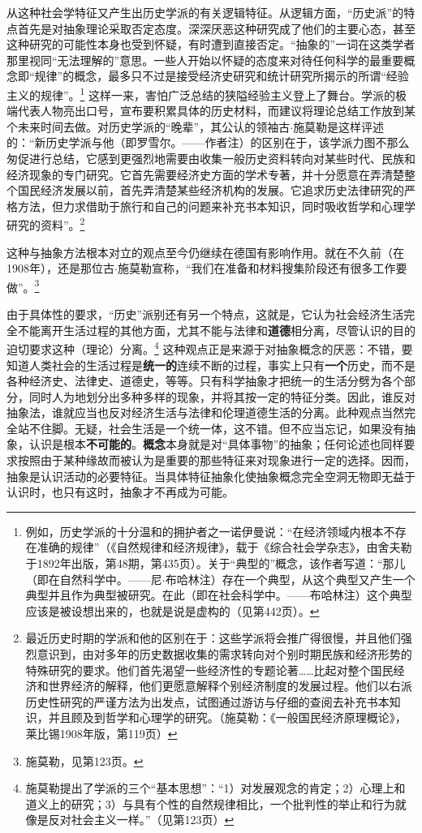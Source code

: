 \documentclass[fontset=fandol, a4paper, 12pt, openright]{ctexbook}
\begin{document}
从这种社会学特征又产生出历史学派的有关逻辑特征。从逻辑方面，“历史派”的特点首先是对抽象理论采取否定态度。深深厌恶这种研究成了他们的主要心态，甚至这种研究的可能性本身也受到怀疑，有时遭到直接否定。“抽象的”一词在这类学者那里视同“无法理解的”意思。一些人开始以怀疑的态度来对待任何科学的最重要概念即“规律”的概念，最多只不过是接受经济史研究和统计研究所揭示的所谓“经验主义的规律”。\footnote{例如，历史学派的十分温和的拥护者之一诺伊曼说：“在经济领域内根本不存在准确的规律”（《自然规律和经济规律》，载于《综合社会学杂志》，由舍夫勒于1892年出版，第48期，第435页）。关于“典型的”概念，该作者写道：“那儿（即在自然科学中。——尼$\cdot$布哈林注）存在一个典型，从这个典型又产生一个典型并且作为典型被研究。在此（即在社会科学中。——布哈林注）这个典型应该是被设想出来的，也就是说是虚构的（见第442页）。} 这样一来，害怕广泛总结的狭隘经验主义登上了舞台。学派的极端代表人物亮出口号，宣布要积累具体的历史材料，而建议将理论总结工作放到某个未来时间去做。对历史学派的“晚辈”，其公认的领袖古$\cdot$施莫勒是这样评述的：“新历史学派与他（即罗雪尔。——作者注）的区别在于，该学派力图不那么匆促进行总结，它感到更强烈地需要由收集一般历史资料转向对某些时代、民族和经济现象的专门研究。它首先需要经济史方面的学术专著，并十分愿意在弄清楚整个国民经济发展以前，首先弄清楚某些经济机构的发展。它追求历史法律研究的严格方法，但力求借助于旅行和自己的问题来补充书本知识，同时吸收哲学和心理学研究的资料”。\footnote{最近历史时期的学派和他的区别在于：这些学派将会推广得很慢，并且他们强烈意识到，由对多年的历史数据收集的需求转向对个别时期民族和经济形势的特殊研究的要求。他们首先渴望一些经济性的专题论著……比起对整个国民经济和世界经济的解释，他们更愿意解释个别经济制度的发展过程。他们以右派历史性研究的严谨方法为出发点，试图通过游访与仔细的查阅去补充书本知识，并且顾及到哲学和心理学的研究。（施莫勒：《一般国民经济原理概论》，莱比锡1908年版，第119页）}

这种与抽象方法根本对立的观点至今仍继续在德国有影响作用。就在不久前（在1908年），还是那位古$\cdot$施莫勒宣称，“我们在准备和材料搜集阶段还有很多工作要做”。\footnote{施莫勒，见第123页。}

由于具体性的要求，“历史”派别还有另一个特点，这就是，它认为社会经济生活完全不能离开生活过程的其他方面，尤其不能与法律和\textbf{道德}相分离，尽管认识的目的迫切要求这种（理论）分离。\footnote{施莫勒提出了学派的三个“基本思想”：“1）对发展观念的肯定；2）心理上和道义上的研究；3）与具有个性的自然规律相比，一个批判性的举止和行为就像是反对社会主义一样。”（见第123页）} 这种观点正是来源于对抽象概念的厌恶：不错，要知道人类社会的生活过程是\textbf{统一的}连续不断的过程，事实上只有\textbf{一个}历史，而不是各种经济史、法律史、道德史，等等。只有科学抽象才把统一的生活分劈为各个部分，同时人为地划分出多种多样的现象，并将其按一定的特征分类。因此，谁反对抽象法，谁就应当也反对经济生活与法律和伦理道德生活的分离。此种观点当然完全站不住脚。无疑，社会生活是一个统一体，这不错。但不应当忘记，如果没有抽象，认识是根本\textbf{不可能的}。\textbf{概念}本身就是对“具体事物”的抽象；任何论述也同样要求按照由于某种缘故而被认为是重要的那些特征来对现象进行一定的选择。因而，抽象是认识活动的必要特征。当具体特征抽象化使抽象概念完全空洞无物即无益于认识时，也只有这时，抽象才不再成为可能。
\end{document}
